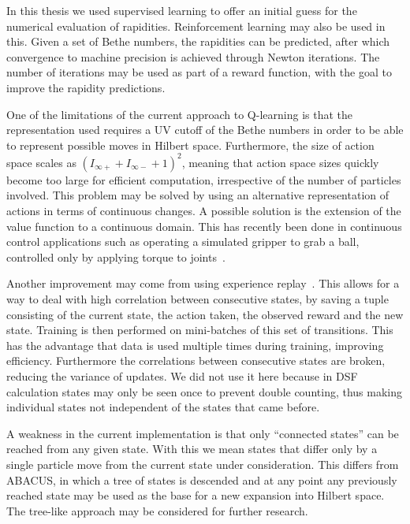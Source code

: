 \documentclass[11pt, a4paper]{report} %
\begin{document}
In this thesis we used supervised learning to offer an initial guess for the numerical evaluation of rapidities.
Reinforcement learning may also be used in this.
Given a set of Bethe numbers, the rapidities can be predicted, after which convergence to machine precision is achieved through Newton iterations.
The number of iterations may be used as part of a reward function, with the goal to improve the rapidity predictions.

One of the limitations of the current approach to Q-learning is that the representation used requires a UV cutoff of the Bethe numbers in order to be able to represent possible moves in Hilbert space.
Furthermore, the size of action space scales as \((I_{\infty+} + I_{\infty-} + 1)^2\), meaning that action space sizes quickly become too large for efficient computation, irrespective of the number of particles involved.
This problem may be solved by using an alternative representation of actions in terms of continuous changes.
A possible solution is the extension of the value function to a continuous domain.
This has recently been done in continuous control applications such as operating a simulated gripper to grab a ball, controlled only by applying torque to joints~\cite{lillicrap15_contin_contr_with_deep_reinf_learn,gu16_contin_deep_q_learn_with}.

Another improvement may come from using experience replay~\cite{mnih15_human_level_contr_throug_deep_reinf_learn,mnih13_playin_atari_with_deep_reinf_learn}.
This allows for a way to deal with high correlation between consecutive states, by saving a tuple consisting of the current state, the action taken, the observed reward and the new state.
Training is then performed on mini-batches of this set of transitions.
This has the advantage that data is used multiple times during training, improving efficiency.
Furthermore the correlations between consecutive states are broken, reducing the variance of updates.
We did not use it here because in DSF calculation states may only be seen once to prevent double counting, thus making individual states not independent of the states that came before.

A weakness in the current implementation is that only ``connected states'' can be reached from any given state.
With this we mean states that differ only by a single particle move from the current state under consideration.
This differs from ABACUS, in which a tree of states is descended and at any point any previously reached state may be used as the base for a new expansion into Hilbert space.
The tree-like approach may be considered for further research.
\end{document}
